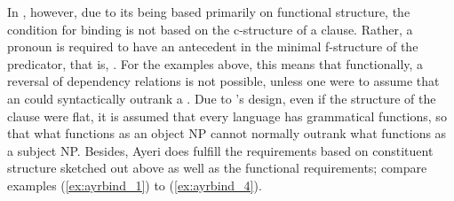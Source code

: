 In \Lfg{}, however, due to its being based primarily on functional structure,
the condition for binding is not based on the c-structure of a clause. Rather,
a pronoun is required to have an antecedent in the minimal f-structure of the
predicator, that is, 
\parencites[230]{bresnan2016}[250]{bresnan2016}. For the examples above, this
means that functionally, a reversal of dependency relations is not possible,
unless one were to assume that an \Obj{} could syntactically outrank a
\Subj{}. Due to \Lfg{}'s design, even if the structure of the clause were flat,
it is assumed that every language has grammatical functions, so that what
functions as an object NP cannot normally outrank what functions as a subject
NP. Besides, Ayeri does fulfill the requirements based on constituent structure
sketched out above as well as the functional requirements; compare examples
(\ref{ex:ayrbind_1}) to (\ref{ex:ayrbind_4}).

